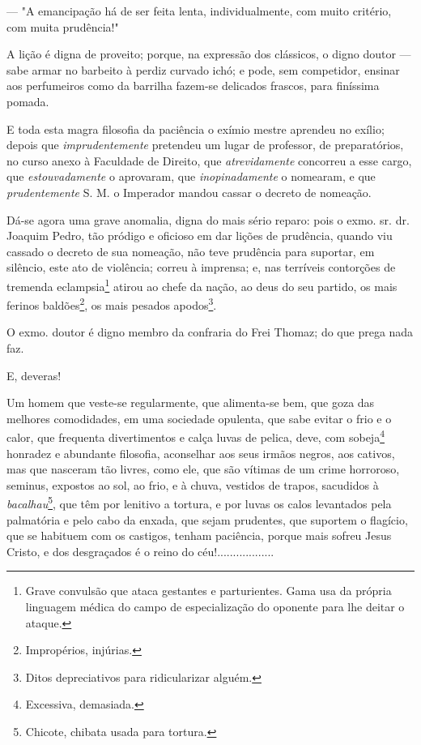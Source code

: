 --- "A emancipação há de ser feita lenta, individualmente, com muito
critério, com muita prudência!"

A lição é digna de proveito; porque, na expressão dos clássicos, o digno
doutor --- sabe armar no barbeito à perdiz curvado ichó; e pode, sem
competidor, ensinar aos perfumeiros como da barrilha fazem-se delicados
frascos, para finíssima pomada.

E toda esta magra filosofia da paciência o exímio mestre aprendeu no
exílio; depois que \emph{imprudentemente} pretendeu um lugar de
professor, de preparatórios, no curso anexo à Faculdade de Direito, que
\emph{atrevidamente} concorreu a esse cargo, que \emph{estouvadamente} o
aprovaram, que \emph{inopinadamente} o nomearam, e que
\emph{prudentemente} S. M. o Imperador mandou cassar o decreto de
nomeação.

Dá-se agora uma grave anomalia, digna do mais sério reparo: pois o exmo.
sr. dr. Joaquim Pedro, tão pródigo e oficioso em dar lições de
prudência, quando viu cassado o decreto de sua nomeação, não teve
prudência para suportar, em silêncio, este ato de violência; correu à
imprensa; e, nas terríveis contorções de tremenda eclampsia\footnote{
  Grave convulsão que ataca gestantes e parturientes. Gama usa da
  própria linguagem médica do campo de especialização do oponente para
  lhe deitar o ataque.} atirou ao chefe da nação, ao deus do seu
partido, os mais ferinos baldões\footnote{Impropérios, injúrias.}, os
mais pesados apodos\footnote{Ditos depreciativos para ridicularizar
  alguém.}.

O exmo. doutor é digno membro da confraria do Frei Thomaz; do que prega
nada faz.

E, deveras!

Um homem que veste-se regularmente, que alimenta-se bem, que goza das
melhores comodidades, em uma sociedade opulenta, que sabe evitar o frio
e o calor, que frequenta divertimentos e calça luvas de pelica, deve,
com sobeja\footnote{Excessiva, demasiada.} honradez e abundante
filosofia, aconselhar aos seus irmãos negros, aos cativos, mas que
nasceram tão livres, como ele, que são vítimas de um crime horroroso,
seminus, expostos ao sol, ao frio, e à chuva, vestidos de trapos,
sacudidos à \emph{bacalhau}\footnote{Chicote, chibata usada para
  tortura.}, que têm por lenitivo a tortura, e por luvas os calos
levantados pela palmatória e pelo cabo da enxada, que sejam prudentes,
que suportem o flagício, que se habituem com os castigos, tenham
paciência, porque mais sofreu Jesus Cristo, e dos desgraçados é o reino
do céu!..................

